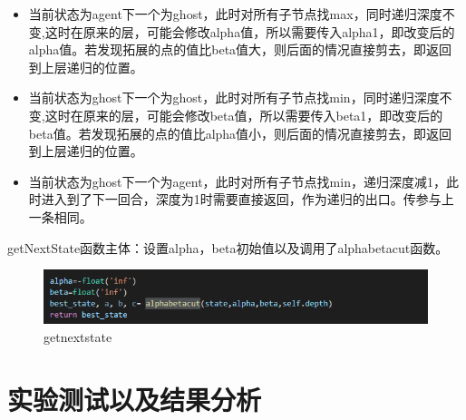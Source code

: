 \documentclass{report}
\begin{document}
    \begin{itemize}
        \item 当前状态为agent下一个为ghost，此时对所有子节点找max，同时递归深度不变,这时在原来的层，可能会修改alpha值，所以需要传入alpha1，即改变后的alpha值。若发现拓展的点的值比beta值大，则后面的情况直接剪去，即返回到上层递归的位置。
        \item 当前状态为ghost下一个为ghost，此时对所有子节点找min，同时递归深度不变,这时在原来的层，可能会修改beta值，所以需要传入beta1，即改变后的beta值。若发现拓展的点的值比alpha值小，则后面的情况直接剪去，即返回到上层递归的位置。
        \item 当前状态为ghost下一个为agent，此时对所有子节点找min，递归深度减1，此时进入到了下一回合，深度为1时需要直接返回，作为递归的出口。传参与上一条相同。
    \end{itemize}
    getNextState函数主体：设置alpha，beta初始值以及调用了alphabetacut函数。
    \begin{figure}[h]
        \centering
        \includegraphics[width=15cm]{6.png}
        \caption{getnextstate}
    \end{figure}
    \chapter{实验测试以及结果分析}
\end{document}

